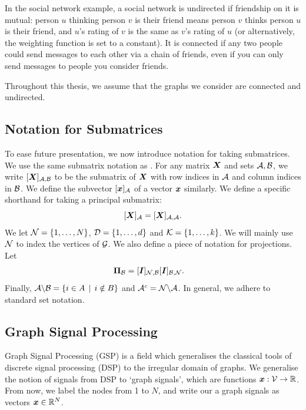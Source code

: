 In the social network example, a social network is undirected if friendship on it is mutual: person $u$ thinking person $v$ is their friend means person $v$ thinks person $u$ is their friend, and $u$'s rating of $v$ is the same as $v$'s rating of $u$ (or alternatively, the weighting function is set to a constant). It is connected if any two people could send messages to each other via a chain of friends, even if you can only send messages to people you consider friends.

Throughout this thesis, we assume that the graphs we consider are connected and undirected.


\subsection{Notation for Submatrices}
\label{sec:notation}
To ease future presentation, we now introduce notation for taking submatrices.
We use the same submatrix notation as \cite{zhang2000schur}.  For any matrix $\bm{X}$ and sets $\mathcal{A},\mathcal{B}$, we write $\matrsub[A,B]{X}$ to be the submatrix of $\bm{X}$ with row indices in $\mathcal{A}$ and column indices in $\mathcal{B}$. We define the subvector $\vectsub[A]{x}$ of a vector $\bm{x}$ similarly. We define a specific shorthand for taking a principal submatrix:
\begin{equation}
    \matrsub[A]{X} = \matrsub[A,A]{X}.
\end{equation}
We let $\mathcal{N} = \{1, \ldots, N\}$, $\mathcal{D} = \{1,\ldots,d\}$ and $\mathcal{K} = \{1, \ldots, k\}$. We will mainly use $\mathcal{N}$ to index the vertices of $\mathcal{G}$. We also define a piece of notation for projections. Let
\begin{align}
    \proj{B} &= \matrsub[N,B]{I}\matrsub[B,N]{I}. %
\end{align}
Finally, $\mathcal{A} \backslash \mathcal{B} = \{ i \in A \, \mid \, i \notin B \} $ and $\mathcal{A}^{c} = \mathcal{N} \backslash \mathcal{A}$. In general, we adhere to standard set notation.




\subsection{Graph Signal Processing}
Graph Signal Processing (GSP) is a field which generalises the classical tools of discrete signal processing (DSP) to the irregular domain of graphs. We generalise the notion of signals from DSP to `graph signals', which are functions $\bm{x}:\mathcal{V} \to \mathbb{R}$. From now, we label the nodes from 1 to $N$, and write our a graph signals as vectors $\bm{x} \in \mathbb{R}^{N}$.

